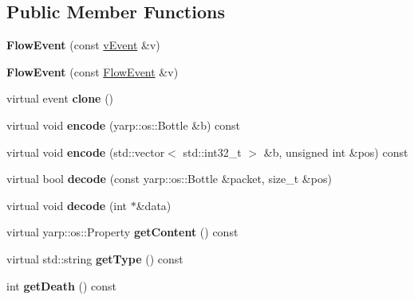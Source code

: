 \subsection*{Public Member Functions}
\begin{DoxyCompactItemize}
\item 
{\bfseries Flow\+Event} (const \hyperlink{classev_1_1vEvent}{v\+Event} \&v)\hypertarget{classev_1_1FlowEvent_aa268bbbeb75a7ec0634e7eff9bf9dda5}{}\label{classev_1_1FlowEvent_aa268bbbeb75a7ec0634e7eff9bf9dda5}

\item 
{\bfseries Flow\+Event} (const \hyperlink{classev_1_1FlowEvent}{Flow\+Event} \&v)\hypertarget{classev_1_1FlowEvent_a0784e0ce0b0b1fb1d9c61f8134efa70b}{}\label{classev_1_1FlowEvent_a0784e0ce0b0b1fb1d9c61f8134efa70b}

\item 
virtual event {\bfseries clone} ()\hypertarget{classev_1_1FlowEvent_a6a108ba6028ea69a9398745074d7300f}{}\label{classev_1_1FlowEvent_a6a108ba6028ea69a9398745074d7300f}

\item 
virtual void {\bfseries encode} (yarp\+::os\+::\+Bottle \&b) const \hypertarget{classev_1_1FlowEvent_a13c900d7027a67d8197e32d56e92e0b0}{}\label{classev_1_1FlowEvent_a13c900d7027a67d8197e32d56e92e0b0}

\item 
virtual void {\bfseries encode} (std\+::vector$<$ std\+::int32\+\_\+t $>$ \&b, unsigned int \&pos) const \hypertarget{classev_1_1FlowEvent_abe186cc79d3019a688192ac753a17888}{}\label{classev_1_1FlowEvent_abe186cc79d3019a688192ac753a17888}

\item 
virtual bool {\bfseries decode} (const yarp\+::os\+::\+Bottle \&packet, size\+\_\+t \&pos)\hypertarget{classev_1_1FlowEvent_a0c6e4d68d303d9cc4016959dc065c12a}{}\label{classev_1_1FlowEvent_a0c6e4d68d303d9cc4016959dc065c12a}

\item 
virtual void {\bfseries decode} (int $\ast$\&data)\hypertarget{classev_1_1FlowEvent_ae473840ca6fd597ff529f73c8b3f1705}{}\label{classev_1_1FlowEvent_ae473840ca6fd597ff529f73c8b3f1705}

\item 
virtual yarp\+::os\+::\+Property {\bfseries get\+Content} () const \hypertarget{classev_1_1FlowEvent_a299486f89e1f893a513d237fd70ba00c}{}\label{classev_1_1FlowEvent_a299486f89e1f893a513d237fd70ba00c}

\item 
virtual std\+::string {\bfseries get\+Type} () const \hypertarget{classev_1_1FlowEvent_a181159b6f05391e438b4a68908e572fb}{}\label{classev_1_1FlowEvent_a181159b6f05391e438b4a68908e572fb}

\item 
int {\bfseries get\+Death} () const \hypertarget{classev_1_1FlowEvent_ac39faf9016620faaddccd6c15b9f513f}{}\label{classev_1_1FlowEvent_ac39faf9016620faaddccd6c15b9f513f}

\end{DoxyCompactItemize}
